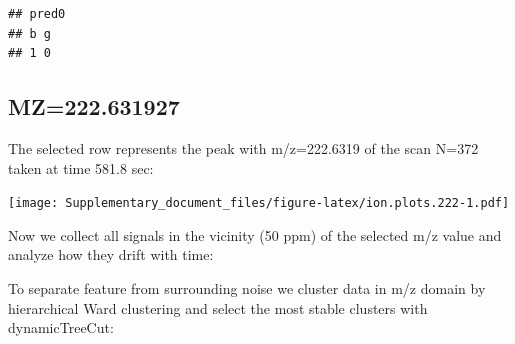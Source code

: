 \documentclass[]{article}
\newenvironment{Shaded}{\begin{snugshade}}{\end{snugshade}}
\newcommand{\KeywordTok}[1]{\textcolor[rgb]{0.13,0.29,0.53}{\textbf{#1}}}
\newcommand{\FloatTok}[1]{\textcolor[rgb]{0.00,0.00,0.81}{#1}}
\newcommand{\StringTok}[1]{\textcolor[rgb]{0.31,0.60,0.02}{#1}}
\newcommand{\OperatorTok}[1]{\textcolor[rgb]{0.81,0.36,0.00}{\textbf{#1}}}
\newcommand{\NormalTok}[1]{#1}
\begin{document}
\begin{verbatim}
## pred0
## b g 
## 1 0
\end{verbatim}

\subsection{MZ=222.631927}\label{mz222.631927}

\begin{Shaded}
\end{Shaded}

The selected row represents the peak with m/z=222.6319 of the scan N=372
taken at time 581.8 sec:

\begin{Shaded}
\end{Shaded}

\texttt{[image: Supplementary\_document\_files/figure-latex/ion.plots.222-1.pdf]}

Now we collect all signals in the vicinity (50 ppm) of the selected m/z
value and analyze how they drift with time:

\begin{Shaded}
\end{Shaded}

To separate feature from surrounding noise we cluster data in m/z domain
by hierarchical Ward clustering and select the most stable clusters with
dynamicTreeCut:
\end{document}
